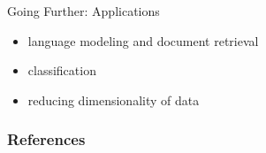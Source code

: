 \documentclass[aspectratio=169]{beamer}
\begin{document}
    \begin{frame}{Going Further: Applications}
      \begin{itemize}
        \item language modeling and document retrieval
        \item classification
        \item reducing dimensionality of data
      \end{itemize}
    \end{frame}

  \begin{frame}
    \frametitle{References}
    \tiny
    \begin{multicols}{2}
      \nocite{*}
      
    \end{multicols}
  \end{frame}
\end{document}
